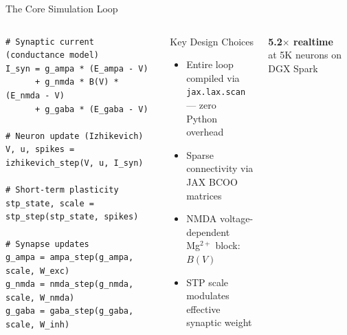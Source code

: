 \documentclass[aspectratio=169,10pt]{beamer}
\begin{document}
\begin{frame}{The Core Simulation Loop}
\begin{columns}[T]
\begin{lstlisting}[title={\scriptsize\bfseries One timestep (JIT-compiled)}]
# Synaptic current (conductance model)
I_syn = g_ampa * (E_ampa - V)
      + g_nmda * B(V) * (E_nmda - V)
      + g_gaba * (E_gaba - V)

# Neuron update (Izhikevich)
V, u, spikes = izhikevich_step(V, u, I_syn)

# Short-term plasticity
stp_state, scale = stp_step(stp_state, spikes)

# Synapse updates
g_ampa = ampa_step(g_ampa, scale, W_exc)
g_nmda = nmda_step(g_nmda, scale, W_nmda)
g_gaba = gaba_step(g_gaba, scale, W_inh)
\end{lstlisting}

\vspace{12pt}
\begin{block}{\small Key Design Choices}
\begin{itemize}\scriptsize
  \item Entire loop compiled via\\\texttt{jax.lax.scan} --- zero\\Python overhead
  \item Sparse connectivity via\\JAX BCOO matrices
  \item NMDA voltage-dependent\\Mg$^{2+}$ block: $B(V)$
  \item STP scale modulates\\effective synaptic weight
\end{itemize}
\end{block}

\vspace{6pt}
\centering\scriptsize\color{bl1blue}
\textbf{5.2$\times$ realtime}\\at 5K neurons on DGX Spark
\end{columns}
\end{frame}
\end{document}
